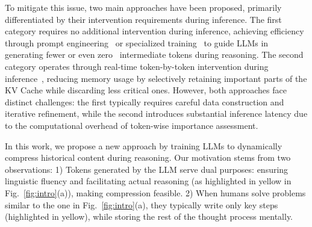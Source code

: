 To mitigate this issue, two main approaches have been proposed, primarily differentiated by their intervention requirements during inference.
The first category requires no additional intervention during inference, achieving efficiency through prompt engineering~\citep{arxiv24_tale,arxiv24_break_the_chain,arxiv24_concise_thoughts} or specialized training~\citep{nips24_skip_steps,arxiv24_c3ot,arxiv25_related_work_rl1,arxiv25_o1_pruner,arxiv24_ccot,arxiv24_coconut} to guide LLMs in generating fewer or even zero~\citep{arxiv23_kd_cot,arxiv24_icot} intermediate tokens during reasoning. %
The second category operates through real-time token-by-token intervention during inference~\citep{nips23_h2o,arxiv24_sepllm}, reducing memory usage by selectively retaining important parts of the KV Cache while discarding less critical ones.
However, both approaches face distinct challenges: the first typically requires careful data construction and iterative refinement, while the second introduces substantial inference latency due to the computational overhead of token-wise importance assessment.

In this work, we propose a new approach by training LLMs to dynamically compress historical content during reasoning. 
Our motivation stems from two observations: 
1) Tokens generated by the LLM serve dual purposes: 
ensuring linguistic fluency and facilitating actual reasoning (as highlighted in yellow in Fig.~\ref{fig:intro}(a)), making compression feasible. 
2) When humans solve problems similar to the one in Fig.~\ref{fig:intro}(a), they typically write only key steps (highlighted in yellow), while storing the rest of the thought process mentally.

